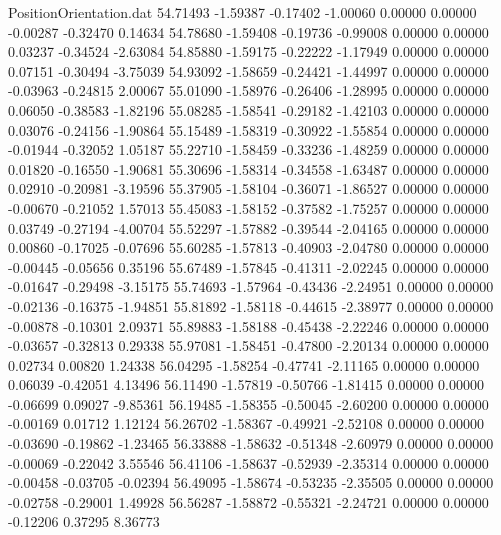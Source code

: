 \begin{filecontents}{PositionOrientation.dat}
  54.71493   -1.59387   -0.17402    -1.00060    0.00000    0.00000   -0.00287   -0.32470    0.14634
  54.78680   -1.59408   -0.19736    -0.99008    0.00000    0.00000    0.03237   -0.34524   -2.63084
  54.85880   -1.59175   -0.22222    -1.17949    0.00000    0.00000    0.07151   -0.30494   -3.75039
  54.93092   -1.58659   -0.24421    -1.44997    0.00000    0.00000   -0.03963   -0.24815    2.00067
  55.01090   -1.58976   -0.26406    -1.28995    0.00000    0.00000    0.06050   -0.38583   -1.82196
  55.08285   -1.58541   -0.29182    -1.42103    0.00000    0.00000    0.03076   -0.24156   -1.90864
  55.15489   -1.58319   -0.30922    -1.55854    0.00000    0.00000   -0.01944   -0.32052    1.05187
  55.22710   -1.58459   -0.33236    -1.48259    0.00000    0.00000    0.01820   -0.16550   -1.90681
  55.30696   -1.58314   -0.34558    -1.63487    0.00000    0.00000    0.02910   -0.20981   -3.19596
  55.37905   -1.58104   -0.36071    -1.86527    0.00000    0.00000   -0.00670   -0.21052    1.57013
  55.45083   -1.58152   -0.37582    -1.75257    0.00000    0.00000    0.03749   -0.27194   -4.00704
  55.52297   -1.57882   -0.39544    -2.04165    0.00000    0.00000    0.00860   -0.17025   -0.07696
  55.60285   -1.57813   -0.40903    -2.04780    0.00000    0.00000   -0.00445   -0.05656    0.35196
  55.67489   -1.57845   -0.41311    -2.02245    0.00000    0.00000   -0.01647   -0.29498   -3.15175
  55.74693   -1.57964   -0.43436    -2.24951    0.00000    0.00000   -0.02136   -0.16375   -1.94851
  55.81892   -1.58118   -0.44615    -2.38977    0.00000    0.00000   -0.00878   -0.10301    2.09371
  55.89883   -1.58188   -0.45438    -2.22246    0.00000    0.00000   -0.03657   -0.32813    0.29338
  55.97081   -1.58451   -0.47800    -2.20134    0.00000    0.00000    0.02734    0.00820    1.24338
  56.04295   -1.58254   -0.47741    -2.11165    0.00000    0.00000    0.06039   -0.42051    4.13496
  56.11490   -1.57819   -0.50766    -1.81415    0.00000    0.00000   -0.06699    0.09027   -9.85361
  56.19485   -1.58355   -0.50045    -2.60200    0.00000    0.00000   -0.00169    0.01712    1.12124
  56.26702   -1.58367   -0.49921    -2.52108    0.00000    0.00000   -0.03690   -0.19862   -1.23465
  56.33888   -1.58632   -0.51348    -2.60979    0.00000    0.00000   -0.00069   -0.22042    3.55546
  56.41106   -1.58637   -0.52939    -2.35314    0.00000    0.00000   -0.00458   -0.03705   -0.02394
  56.49095   -1.58674   -0.53235    -2.35505    0.00000    0.00000   -0.02758   -0.29001    1.49928
  56.56287   -1.58872   -0.55321    -2.24721    0.00000    0.00000   -0.12206    0.37295    8.36773

\end{filecontents}
